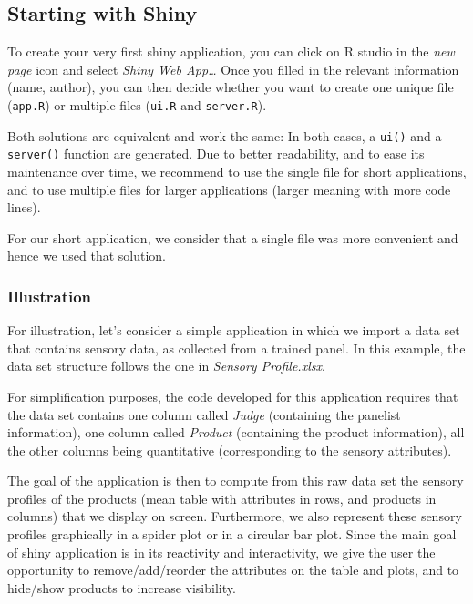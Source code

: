\documentclass[
]{book}
\begin{document}
\hypertarget{starting-with-shiny}{%
\subsection{Starting with Shiny}\label{starting-with-shiny}}

To create your very first shiny application, you can click on R studio in the \emph{new page} icon and select \emph{Shiny Web App\ldots{}}
Once you filled in the relevant information (name, author), you can then decide whether you want to create one unique file (\texttt{app.R}) or multiple files (\texttt{ui.R} and \texttt{server.R}).

Both solutions are equivalent and work the same: In both cases, a \texttt{ui()} and a \texttt{server()} function are generated. Due to better readability, and to ease its maintenance over time, we recommend to use the single file for short applications, and to use multiple files for larger applications (larger meaning with more code lines).

For our short application, we consider that a single file was more convenient and hence we used that solution.

\hypertarget{illustration}{%
\subsubsection{Illustration}\label{illustration}}

For illustration, let's consider a simple application in which we import a data set that contains sensory data, as collected from a trained panel. In this example, the data set structure follows the one in \emph{Sensory Profile.xlsx}.

For simplification purposes, the code developed for this application requires that the data set contains one column called \emph{Judge} (containing the panelist information), one column called \emph{Product} (containing the product information), all the other columns being quantitative (corresponding to the sensory attributes).

The goal of the application is then to compute from this raw data set the sensory profiles of the products (mean table with attributes in rows, and products in columns) that we display on screen. Furthermore, we also represent these sensory profiles graphically in a spider plot or in a circular bar plot.
Since the main goal of shiny application is in its reactivity and interactivity, we give the user the opportunity to remove/add/reorder the attributes on the table and plots, and to hide/show products to increase visibility.
\end{document}

